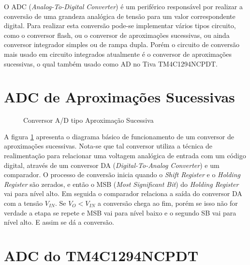 O ADC (\emph{Analog-To-Digital Converter}) é um periférico responsável por realizar a conversão de uma grandeza analógica de tensão para um valor correspondente digital. Para realizar esta conversão pode-se implementar vários  tipos circuito, como o conversor flash, ou o conversor de aproximações sucessivas, ou ainda conversor integrador simples ou de rampa dupla. Porém o  circuito de conversão mais usado em circuito integrados atualmente é o conversor de aproximações sucessivas, o qual também usado como AD no Tiva TM4C1294NCPDT. 


\section{ADC de Aproximações Sucessivas}

\begin{figure}[H]
	\centering
	\caption{Conversor A/D tipo Aproximação Sucessiva}
	\label{fig:ConversorAD}
\end{figure}

 A figura \ref{fig:ConversorAD} apresenta o diagrama básico de funcionamento de um conversor de aproximações sucessivas. Nota-se que tal conversor utiliza a técnica de realimentação para relacionar uma voltagem analógica de entrada com um código digital, através de um conversor DA (\emph{Digital-To-Analog Converter}) e um comparador. O processo de conversão inicia quando o \emph{Shift Register} e o \emph{Holding Register} são zerados, e então o MSB (\emph{Most Significant Bit}) do \emph{Holding Register} vai para nível alto. Em seguida o comparador relaciona a saída do conversor DA com a tensão $V_{IN}$. Se $V_{O} < V_{IN}$ a conversão chega ao fim, porém se isso não for verdade a etapa se repete e MSB vai para nível baixo e o segundo SB vai para nível alto. E assim se dá a conversão. 

\section{ADC do TM4C1294NCPDT}

